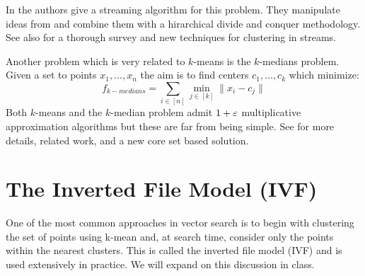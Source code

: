 \documentclass{article}
\begin{document}
In \cite{AilonJM09} the authors give a streaming algorithm for this problem.
They manipulate ideas from \cite{ArthurV07} and combine them with a hirarchical 
divide and conquer methodology. See also \cite{GuhaMMMO03} for a thorough survey and
new techniques for clustering in streams.

Another problem which is very related to $k$-means is the $k$-medians problem.
Given a set to points $x_1,\ldots,x_n$ the aim is to find centers $c_1,\ldots,c_k$ which minimize:
\[
f_{k-medians} = \sum_{i \in [n]} \min_{j \in [k]} \|x_i - c_j \|
\]
Both $k$-means and the $k$-median problem admit $1+\varepsilon$ multiplicative approximation algorithms but these
are far from being simple. See \cite{hk-sckmk-05} for more details, related work, and a new core set based solution. 

\section{The Inverted File Model (IVF)}
One of the most common approaches in vector search is to begin with clustering the set of points using k-mean and, at search time, consider only the points within the nearest clusters. This is called the inverted file model (IVF) and is used extensively in practice. We will expand on this discussion in class.  





\end{document}
